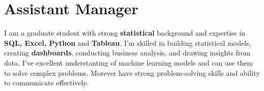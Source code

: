 
\section{Assistant Manager}
\small{
    I am a graduate student with strong \textbf{statistical} background and expertise in \textbf{SQL, Excel, Python} and \textbf{Tableau}. I'm skilled in building statistical models, creating \textbf{dashboards}, conducting business analysis, and drawing insights from data. I've excellent understanting of machine learning models and can use them to solve complex problems. Morever have strong problem-solving skills and ability to communicate effectively.
}